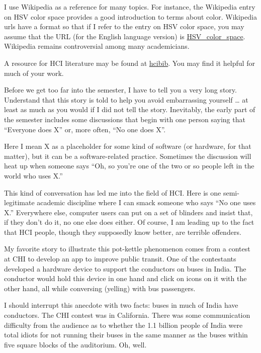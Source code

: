 I use Wikipedia as a reference for many topics. For instance, the
Wikipedia entry on HSV color space provides a good introduction to terms
about color. Wikipedia urls have a format so that if I refer to the
entry on HSV color space, you may assume that the URL (for the English
language version) is
\href{http://en.wikipedia.org/wiki/HSV_color_space}{HSV\_color\_space}.
Wikipedia remains controversial among many academicians.

A resource for HCI literature may be found at
\href{http://www.hcibib.org}{hcibib}. You may find it helpful for much
of your work.

\hypertarget{being-the-center-of-the-universe}{%
\label{being-the-center-of-the-universe}}

Before we get too far into the semester, I have to tell you a very long
story. Understand that this story is told to help you avoid embarrassing
yourself \ldots{} at least as much as you would if I did not tell the
story. Inevitably, the early part of the semester includes some
discussions that begin with one person saying that ``Everyone does X''
or, more often, ``No one does X''.

Here I mean X as a placeholder for some kind of software (or hardware,
for that matter), but it can be a software-related practice. Sometimes
the discussion will heat up when someone says ``Oh, so you're one of the
two or so people left in the world who uses X.''

This kind of conversation has led me into the field of HCI. Here is one
semi-legitimate academic discipline where I can smack someone who says
``No one uses X.'' Everywhere else, computer users can put on a set of
blinders and insist that, if they don't do it, no one else does either.
Of course, I am leading up to the fact that HCI people, though they
supposedly know better, are terrible offenders.

My favorite story to illustrate this pot-kettle phenomenon comes from a
contest at CHI to develop an app to improve public transit. One of the
contestants developed a hardware device to support the conductors on
buses in India. The conductor would hold this device in one hand and
click on icons on it with the other hand, all while conversing (yelling)
with bus passengers.

I should interrupt this anecdote with two facts: buses in much of India
have conductors. The CHI contest was in California. There was some
communication difficulty from the audience as to whether the 1.1 billion
people of India were total idiots for not running their buses in the
same manner as the buses within five square blocks of the auditorium.
Oh, well.

